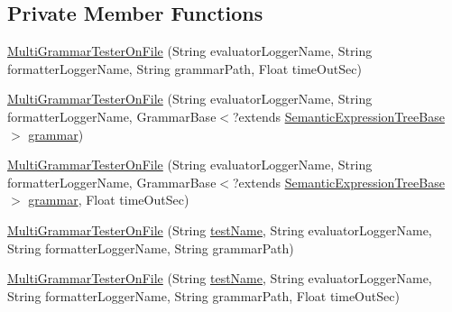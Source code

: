 \subsection*{Private Member Functions}
\begin{DoxyCompactItemize}
\item 
\hyperlink{classit_1_1emarolab_1_1cagg_1_1interfaces_1_1CaggMultiGrammarTesterOnFile_1_1MultiGrammarTesterOnFile_a57167d28843ef2d3057be2402b91c22b}{Multi\-Grammar\-Tester\-On\-File} (String evaluator\-Logger\-Name, String formatter\-Logger\-Name, String grammar\-Path, Float time\-Out\-Sec)
\item 
\hyperlink{classit_1_1emarolab_1_1cagg_1_1interfaces_1_1CaggMultiGrammarTesterOnFile_1_1MultiGrammarTesterOnFile_ad2102bd384f8b44a771dfb0a6fa7eda6}{Multi\-Grammar\-Tester\-On\-File} (String evaluator\-Logger\-Name, String formatter\-Logger\-Name, Grammar\-Base$<$?extends \hyperlink{interfaceit_1_1emarolab_1_1cagg_1_1core_1_1evaluation_1_1semanticGrammar_1_1syntaxCompiler_1_1SemanticExpressionTreeBase}{Semantic\-Expression\-Tree\-Base} $>$ \hyperlink{classit_1_1emarolab_1_1cagg_1_1core_1_1evaluation_1_1interfacing_1_1GrammarTesterBase_ac6601808f37ef4327e6308143f01dc6a}{grammar})
\item 
\hyperlink{classit_1_1emarolab_1_1cagg_1_1interfaces_1_1CaggMultiGrammarTesterOnFile_1_1MultiGrammarTesterOnFile_ae2f215aa2b283d4694370072d47302a6}{Multi\-Grammar\-Tester\-On\-File} (String evaluator\-Logger\-Name, String formatter\-Logger\-Name, Grammar\-Base$<$?extends \hyperlink{interfaceit_1_1emarolab_1_1cagg_1_1core_1_1evaluation_1_1semanticGrammar_1_1syntaxCompiler_1_1SemanticExpressionTreeBase}{Semantic\-Expression\-Tree\-Base} $>$ \hyperlink{classit_1_1emarolab_1_1cagg_1_1core_1_1evaluation_1_1interfacing_1_1GrammarTesterBase_ac6601808f37ef4327e6308143f01dc6a}{grammar}, Float time\-Out\-Sec)
\item 
\hyperlink{classit_1_1emarolab_1_1cagg_1_1interfaces_1_1CaggMultiGrammarTesterOnFile_1_1MultiGrammarTesterOnFile_a06d2807fc2b66d3b0d7a2f87691c73d8}{Multi\-Grammar\-Tester\-On\-File} (String \hyperlink{classit_1_1emarolab_1_1cagg_1_1interfaces_1_1CaggMultiGrammarTesterOnFile_1_1MultiGrammarTesterOnFile_ab134ae20ad2d5a97de6633ae41d6716d}{test\-Name}, String evaluator\-Logger\-Name, String formatter\-Logger\-Name, String grammar\-Path)
\item 
\hyperlink{classit_1_1emarolab_1_1cagg_1_1interfaces_1_1CaggMultiGrammarTesterOnFile_1_1MultiGrammarTesterOnFile_ae67c9309dc2b2662e13a9b7b5042b78d}{Multi\-Grammar\-Tester\-On\-File} (String \hyperlink{classit_1_1emarolab_1_1cagg_1_1interfaces_1_1CaggMultiGrammarTesterOnFile_1_1MultiGrammarTesterOnFile_ab134ae20ad2d5a97de6633ae41d6716d}{test\-Name}, String evaluator\-Logger\-Name, String formatter\-Logger\-Name, String grammar\-Path, Float time\-Out\-Sec)

\end{DoxyCompactItemize}
